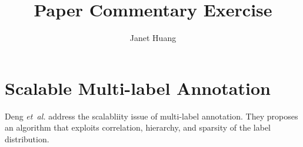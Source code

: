 \documentclass[a4paper]{article}
\title{Paper Commentary Exercise}
\author{Janet Huang}
\begin{document}
\maketitle
\section{Scalable Multi-label Annotation}
Deng \emph{et~al.} \cite{Deng2014} address the scalabliity issue of multi-label annotation. They proposes an algorithm that exploits correlation, hierarchy, and sparsity of the label distribution.







\end{document}
